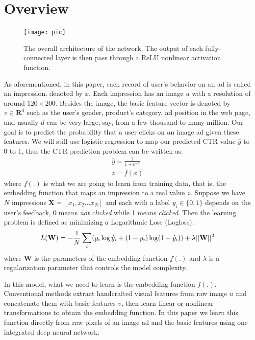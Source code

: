 \documentclass{sig-alternate}
\begin{document}
\section{Overview}\label{Overview}
\begin{figure}
	\centering
	\texttt{[image: pic]}
	\caption{The overall architecture of the network. The output of each fully-connected layer is then pass through a ReLU nonlinear activation function.}
	\label{fig:net}
\end{figure}
As aforementioned,
in this paper, each record of user's behavior on an ad is called an impression. denoted by $x$. Each impression has an image $u$ with a resolution of around $120 \times 200$. Besides the image, the basic feature vector is denoted by $v \in \mathbf{R}^{d}$ such as the  user's gender, product's category, ad position in the web page, and usually $d$ can be very large, say, from a few thousand to many million.
Our goal is to predict the probability that a user clicks on an image ad given these features. We will still use logistic regression to map our predicted CTR value $\hat{y}$ to 0 to 1, thus the CTR prediction problem can be written as:
\begin{gather}
\hat{y} = \frac{1}{1+e^{-z}} \\
z = f(x)
\end{gather}
where $f(.)$ is what we are going to learn from training data, that is, the embedding function that maps an impression to a real value $z$.  Suppose we have $N$ impressions $\mathbf{X}=[x_{1}, x_{2}...x_{N}]$ and each with a label $y_{i} \in \{0,1\}$ depends on the user's feedback, 0 means \emph{not clicked} while 1 means \emph{clicked}. Then the learning problem is defined as minimizing a Logarithmic Loss (Logloss):
\begin{equation}
L(\mathbf{W}) = -\frac{1}{N} \sum_{i} (y_{i} \log \hat{y}_{i} + (1-y_{i}) \log (1-\hat{y}_{i}) )  \\ + \lambda || \mathbf{W}||^{2}
\end{equation}
where $\mathbf{W}$ is the parameters of the embedding function $f(.) $ and $\lambda$ is a regularization parameter that controls the model complexity.

In this model, what we need to learn is the embedding function $f(.)$. Conventional methods extract handcrafted visual features from raw image $u$ and concatenate them with basic features $v$, then learn linear or nonlinear transformations to obtain the embedding function. In this paper we learn this function directly from raw pixels of an image ad and the basic features using one integrated deep neural network.  
\end{document}
